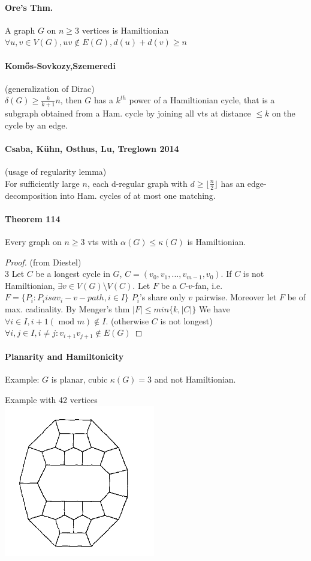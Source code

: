 \paragraph{Ore's Thm.}
A graph $ G $ on $ n \geq 3 $ vertices is Hamiltionian  
$ \forall u,v \in V(G), uv \notin E(G), d(u)+d(v) \geq n $

\paragraph{Kom\H{o}s-Sovkozy,Szemeredi} (generalization of Dirac) \\
$ \delta(G) \geq \frac{k}{k+1} n$, then $ G $ has a $ k^{th} $
power of a Hamiltionian cycle, that is a subgraph obtained from a Ham. cycle by 
joining all vts at distance $ \leq k $ on the cycle by an edge.

\paragraph{Csaba, Kühn, Osthus, Lu, Treglown 2014} (usage of regularity lemma) \\
For sufficiently large $ n $, each d-regular graph with 
$ d \geq \lfloor\frac{n}{2}\rfloor $ 
has an edge-decomposition into Ham. cycles of at most one matching.

\paragraph{Theorem 114} Every graph on $ n \geq 3 $ vts with 
$ \alpha(G) \leq \kappa(G) $ is Hamiltionian.
\begin{proof} (from Diestel) \\3
    Let $ C $ be a longest cycle in $ G $, $ C = (v_0,v_1,...,v_{m-1},v_0)$.
    If $ C $ is not Hamiltionian, $ \exists v \in V(G) \setminus V(C). $
    Let $ F $ be a $C$-$v$-fan, i.e. $ F = \{P_i : P_i is a v_i-v-path, i \in I\} $
    $ P_i$'s share only $ v $ pairwise. Moreover let $ F $ be of max. cadinality.
    By Menger's thm $ |F| \leq min\{k,|C|\} $ We have
     $ \forall i \in I, i+1 (\text{ mod }m) \notin I $. (otherwise $ C $ is not longest)
     $ \forall i,j \in I, i \neq j: v_{i+1}v_{j+1} \notin E(G) $
     
\end{proof}

\paragraph{Planarity and Hamiltonicity}
Example: $ G $ is planar, cubic $ \kappa(G) = 3 $ and not Hamiltionian.

\bigskip
Example with 42 vertices \\
\includegraphics[scale=0.3]{resources/planeNoHam.png} 